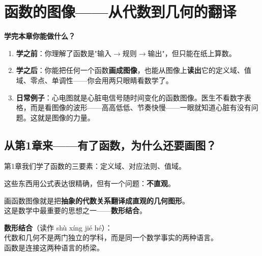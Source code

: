 
\chapter{函数的图像——从代数到几何的翻译}

\begin{applicationbox}
\textbf{学完本章你能做什么？}
\begin{enumerate}
  \item \textbf{学之前}：你理解了函数是"输入$\to$规则$\to$输出"，但只能在纸上算数。
  \item \textbf{学之后}：你能把任何一个函数\textbf{画成图像}，也能从图像上\textbf{读出}它的定义域、值域、零点、单调性——你会用两只眼睛看数学了。
  \item \textbf{日常例子}：心电图就是心脏电信号随时间变化的函数图像。医生不看数字表格，而是看图像的波形——高高低低、节奏快慢——一眼就知道心脏有没有问题。这就是图像的力量。
\end{enumerate}
\end{applicationbox}


\section{从第1章来——有了函数，为什么还要画图？}

第1章我们学了函数的三要素：定义域、对应法则、值域。

这些东西用公式表达很精确，但有一个问题：\textbf{不直观}。

\begin{center}
\end{center}

画函数图像就是把\textbf{抽象的代数关系翻译成直观的几何图形}。\\
这是数学中最重要的思想之一——\textbf{数形结合}。

\begin{notebox}
\textbf{数形结合}（读作 shù xíng jié hé）：\\
代数和几何不是两门独立的学科，而是同一个数学事实的两种语言。\\
函数是连接这两种语言的桥梁。
\end{notebox}


